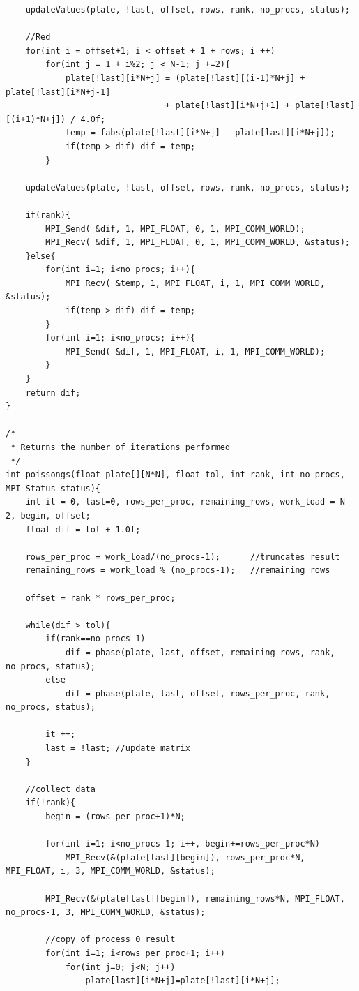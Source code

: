 \documentclass{article}
\begin{document}
\begin{appendices}
\begin{framed}
\begin{verbatim}
    updateValues(plate, !last, offset, rows, rank, no_procs, status);

    //Red
    for(int i = offset+1; i < offset + 1 + rows; i ++)
        for(int j = 1 + i%2; j < N-1; j +=2){
            plate[!last][i*N+j] = (plate[!last][(i-1)*N+j] + plate[!last][i*N+j-1] 
                                + plate[!last][i*N+j+1] + plate[!last][(i+1)*N+j]) / 4.0f;
            temp = fabs(plate[!last][i*N+j] - plate[last][i*N+j]);
            if(temp > dif) dif = temp;
        }

    updateValues(plate, !last, offset, rows, rank, no_procs, status);

    if(rank){
        MPI_Send( &dif, 1, MPI_FLOAT, 0, 1, MPI_COMM_WORLD);
        MPI_Recv( &dif, 1, MPI_FLOAT, 0, 1, MPI_COMM_WORLD, &status);
    }else{
        for(int i=1; i<no_procs; i++){
            MPI_Recv( &temp, 1, MPI_FLOAT, i, 1, MPI_COMM_WORLD, &status);
            if(temp > dif) dif = temp;
        }
        for(int i=1; i<no_procs; i++){
            MPI_Send( &dif, 1, MPI_FLOAT, i, 1, MPI_COMM_WORLD);
        }
    }
    return dif;
}

/*
 * Returns the number of iterations performed
 */
int poissongs(float plate[][N*N], float tol, int rank, int no_procs, MPI_Status status){
    int it = 0, last=0, rows_per_proc, remaining_rows, work_load = N-2, begin, offset;
    float dif = tol + 1.0f;

    rows_per_proc = work_load/(no_procs-1);      //truncates result
    remaining_rows = work_load % (no_procs-1);   //remaining rows

    offset = rank * rows_per_proc;

    while(dif > tol){
        if(rank==no_procs-1)
            dif = phase(plate, last, offset, remaining_rows, rank, no_procs, status);
        else
            dif = phase(plate, last, offset, rows_per_proc, rank, no_procs, status);

        it ++;
        last = !last; //update matrix
    }

    //collect data
    if(!rank){
        begin = (rows_per_proc+1)*N;

        for(int i=1; i<no_procs-1; i++, begin+=rows_per_proc*N)
            MPI_Recv(&(plate[last][begin]), rows_per_proc*N, MPI_FLOAT, i, 3, MPI_COMM_WORLD, &status);

        MPI_Recv(&(plate[last][begin]), remaining_rows*N, MPI_FLOAT, no_procs-1, 3, MPI_COMM_WORLD, &status);

        //copy of process 0 result
        for(int i=1; i<rows_per_proc+1; i++)
            for(int j=0; j<N; j++)
                plate[last][i*N+j]=plate[!last][i*N+j];


\end{verbatim}
\end{framed}
\end{appendices}
\end{document}
